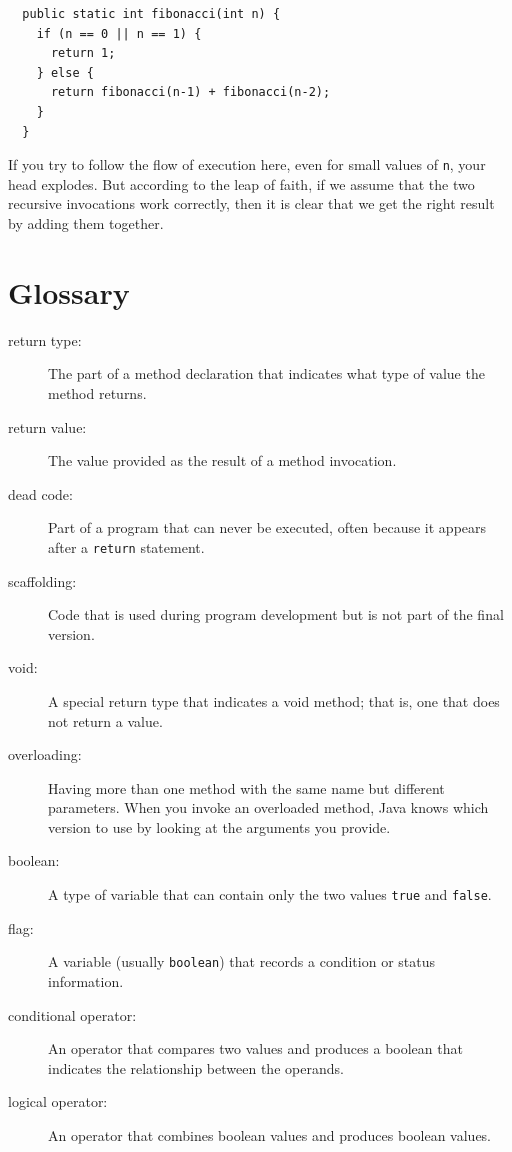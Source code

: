 \begin{lstlisting}
  public static int fibonacci(int n) {
    if (n == 0 || n == 1) {
      return 1;
    } else {
      return fibonacci(n-1) + fibonacci(n-2);
    }
  }
\end{lstlisting}
%
If you try to follow the flow of execution here, even for small
values of {\tt n}, your head explodes.  But according to the leap of
faith, if we assume that the two recursive invocations work correctly, then
it is clear that we get the right result by adding them together.


\section{Glossary}

\begin{description}

\item[return type:]  The part of a method declaration that indicates
what type of value the method returns.

\item[return value:]  The value provided as the result of a method
invocation.

\item[dead code:]  Part of a program that can never be executed,
often because it appears after a {\tt return} statement.

\item[scaffolding:]  Code that is used during program development
but is not part of the final version.

\item[void:]  A special return type that indicates a void method;
that is, one that does not return a value.

\item[overloading:]  Having more than one method with the same name
but different parameters.  When you invoke an overloaded method,
Java knows which version to use by looking at the arguments you
provide.

\item[boolean:]  A type of variable that can contain only the two
values {\tt true} and {\tt false}.

\item[flag:]  A variable (usually {\tt boolean}) that records
a condition or status information.

\item[conditional operator:]  An operator that compares two values
and produces a boolean that indicates the relationship between the
operands.

\item[logical operator:]  An operator that combines boolean values
and produces boolean values.



\end{description}



